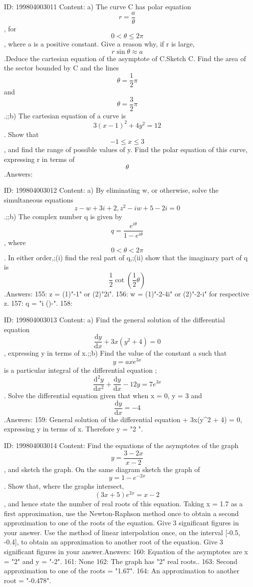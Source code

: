 \documentclass{article}
\begin{document}
ID: 199804003011
Content:
a) The curve C has polar equation \[r = \frac {a}{\theta}\], for \[0 < \theta \leq 2\pi\],  where a is a positive constant. Give a reason why, if r is large, \[r\sin \theta \approx a\].Deduce the cartesian equation of the asymptote of C.Sketch C. Find the area of the sector bounded by C and the lines \[\theta = \frac {1}{2} \pi\] and \[\theta = \frac {3}{2} \pi\].;;b) The cartesian equation of a curve is \[3(x - 1)^2 + 4y^2 = 12\]. Show that \[-1 \leq x \leq 3\], and find the range of possible values of y. Find the polar equation of this curve, expressing r in terms of \[\theta\].Answers:

ID: 199804003012
Content:
a) By eliminating w, or otherwise, solve the simultaneous equations \[z - w + 3i + 2, z^2 -iw + 5 - 2i = 0\].;;b) The complex number q is given by \[q = \frac {e^{i\theta}}{1 - e^{i\theta}}\], where \[0 < \theta < 2\pi\]. In either order,;(i) find the real part of q,;(ii) show that the imaginary part of q is \[\frac {1}{2} \cot (\frac {1}{2}\theta)\].Answers:
155: z = (1)"-1" or (2)"2i".
156: w = (1)"-2-4i" or (2)"-2-i" for respective z.
157: q = "i \cot(\theta)-".
158: 

ID: 199804003013
Content:
a) Find the general solution of the differential equation \[\frac{\mathrm{d} y}{\mathrm{d} x} + 3x(y^2 + 4) = 0\], expressing y in terms of x.;;b) Find the value of the constant a such that \[y=axe^{3x}\] is a particular integral of the differential equation ;\[\frac{\mathrm{d}^2 y}{\mathrm{d} x^2} + \frac{\mathrm{d} y}{\mathrm{d} x} - 12y = 7e^{3x}\]. Solve the differential equation given that when x = 0, y = 3 and \[\frac{\mathrm{d} y}{\mathrm{d} x} = - 4\].Answers:
159: General solution of the differential equation  + 3x(y^2 + 4) = 0, expressing y in terms of x. Therefore y = "2 ".

ID: 199804003014
Content:
Find the equations of the asymptotes of the graph \[y = \frac {3 - 2x}{x - 2}\], and sketch the graph. On the same diagram sketch the graph of \[y = 1 - e^{-2x}\]. Show that, where the graphs intersect, \[(3x + 5)e^{2x} = x - 2\], and hence state the number of real roots of this equation. Taking x = 1.7 as a first approximation, use the Newton-Raphson method once to obtain a second approximation to one of the roots of the equation. Give 3 significant figures in your answer. Use the method of linear interpolation once, on the interval [-0.5, -0.4], to obtain an approximation to another root of the equation. Give 3 significant figures in your answer.Answers:
160: Equation of the asymptotes are x = "2" and y = "-2".
161: None
162: The graph has "2" real roots..
163: Second approximation to one of the roots = "1.67".
164: An approximation to another root = "-0.478".
\end{document}
